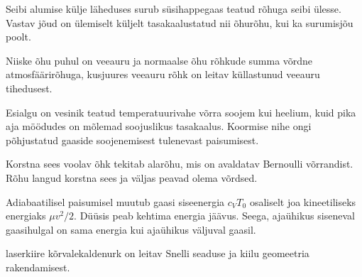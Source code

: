 \documentclass[10pt]{article}
\begin{document}
{%

\hint
Seibi alumise külje läheduses surub süsihappegaas teatud rõhuga seibi ülesse. Vastav jõud on ülemiselt küljelt tasakaalustatud nii õhurõhu, kui ka surumisjõu poolt.
\probend
\bigskip


\hint
Niiske õhu puhul on veeauru ja normaalse õhu rõhkude summa võrdne atmosfäärirõhuga, kusjuures veeauru rõhk on leitav küllastunud veeauru tihedusest.
\probend
\bigskip


\hint
Esialgu on vesinik teatud temperatuurivahe võrra soojem kui heelium, kuid pika aja möödudes on mõlemad soojuslikus tasakaalus. Koormise nihe ongi põhjustatud gaaside soojenemisest tulenevast paisumisest.
\probend
\bigskip


\hint
Korstna sees voolav õhk tekitab alarõhu, mis on avaldatav Bernoulli võrrandist. Rõhu langud korstna sees ja väljas peavad olema võrdsed.
\probend
\bigskip


\hint
Adiabaatilisel paisumisel muutub gaasi siseenergia $c_VT_0$ osaliselt joa kineetiliseks energiaks $\mu v^2/2$. Düüsis peab kehtima energia jäävus. Seega, ajaühikus siseneval gaasihulgal on sama energia kui ajaühikus väljuval gaasil.
\probend
\bigskip


\hint
laserkiire kõrvalekaldenurk on leitav Snelli seaduse ja kiilu geomeetria rakendamisest.
\probend
\bigskip


}
\end{document}
